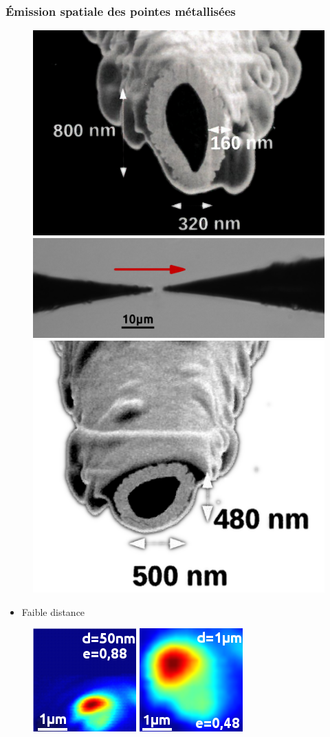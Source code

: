 \documentclass[9pt,a9paper,handout]{beamer}
\begin{document}
    \begin{frame}    
        \frametitle{Émission spatiale des pointes métallisées}
        \begin{figure}[c]\centering
            \includegraphics[height=0.13\textwidth]{Images/PhotosPointes/pointe_metallisee_injection}
            \;
            \includegraphics[height=0.13\textwidth]{Images/PhotosPointes/pointes_metallisees}
            \;
            \includegraphics[height=0.13\textwidth]{Images/PhotosPointes/photo_meb_exemple}
        \end{figure}

        \begin{itemize}
            \item Faible distance
        \end{itemize}
    \vspace*{-6mm}
        \begin{figure}[c]\flushright
            \includegraphics[height=0.15\textwidth]{Images/Scans/Metal_50nm}
            \quad
            \includegraphics[height=0.15\textwidth]{Images/Scans/Metal_1um}
            \quad
        \end{figure}
    \vspace*{5mm}


\end{frame}
\end{document}
